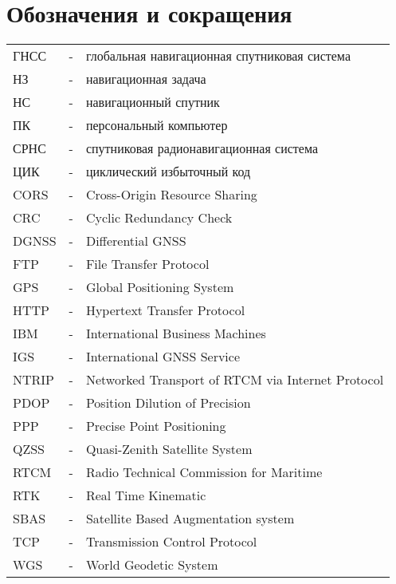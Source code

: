 \section*{Обозначения и сокращения}
\label{cha:acro}

\begin{longtable}{lll}
ГНСС  & - & глобальная навигационная спутниковая система \\ 
НЗ& - & навигационная задача \\ 
НС  & - & навигационный спутник \\ 
ПК  & - & персональный компьютер \\ 
СРНС  & - & спутниковая радионавигационная система \\ 
ЦИК  & - & циклический избыточный код \\ 
CORS  & - & Cross-Origin Resource Sharing \\ 
CRC & - & Cyclic Redundancy Check \\ 
DGNSS & - & Differential GNSS \\ 
FTP  & - & File Transfer Protocol \\ 
GPS  & - & Global Positioning System  \\ 
HTTP  & - & Hypertext Transfer Protocol \\ 
IBM   & - & International Business Machines \\ 
IGS  & - & International GNSS Service \\ 
NTRIP & - & Networked Transport of RTCM via Internet Protocol \\ 
PDOP & - &  Position Dilution of Precision\\ 
PPP & - &  Precise Point Positioning\\ 
QZSS & - &  Quasi-Zenith Satellite System\\ 
RTCM & - &  Radio Technical Commission for Maritime\\ 
RTK & - &  Real Time Kinematic\\ 
SBAS & - &  Satellite Based Augmentation system\\ 
TCP & - &  Transmission Control Protocol\\ 
WGS & - &  World Geodetic System\\ 
\end{longtable} 